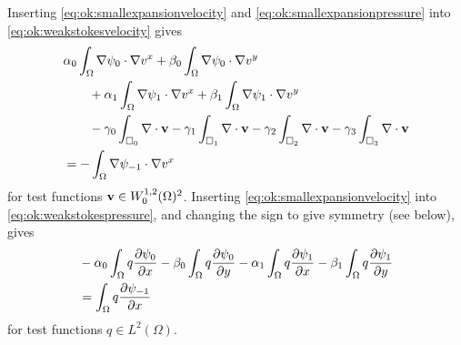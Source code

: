 Inserting \eqref{eq:ok:smallexpansionvelocity} and \eqref{eq:ok:smallexpansionpressure} into \eqref{eq:ok:weakstokesvelocity} gives
\begin{align}
&\alpha_0 \int_\Omega \nabla \psi_0 \cdot \nabla v^x + \beta_0 \int_\Omega \nabla \psi_0 \cdot \nabla v^y \label{eq:ok:smallconcretevelocity} \\
&\qquad + \alpha_1 \int_\Omega \nabla \psi_1 \cdot \nabla v^x + \beta_1 \int_\Omega \nabla \psi_1 \cdot \nabla v^y \notag \\
&\qquad - \gamma_0 \int_{\square_0} \nabla\cdot \mathbf{v} - \gamma_1 \int_{\square_1} \nabla\cdot \mathbf{v} - \gamma_2 \int_{\square_2} \nabla\cdot \mathbf{v} - \gamma_3 \int_{\square_3} \nabla\cdot \mathbf{v} \notag \\
&= - \int_\Omega \nabla \psi_{-1} \cdot \nabla v^x \notag
\end{align}
for test functions $\mathbf{v} \in W_0^{1,2}(\Omega)^2$.  Inserting \eqref{eq:ok:smallexpansionvelocity} into \eqref{eq:ok:weakstokespressure}, and changing the sign to give symmetry (see below), gives
\begin{align}
&- \alpha_0 \int_\Omega q \frac{\partial \psi_0}{\partial x} - \beta_0 \int_\Omega q \frac{\partial \psi_0}{\partial y} - \alpha_1 \int_\Omega q \frac{\partial \psi_1}{\partial x} - \beta_1 \int_\Omega q \frac{\partial \psi_1}{\partial y}  \label{eq:ok:smallconcretepressure} \\
&= \int_\Omega q \frac{\partial \psi_{-1}}{\partial x} \notag
\end{align}
for test functions $q \in L^2(\Omega)$.

